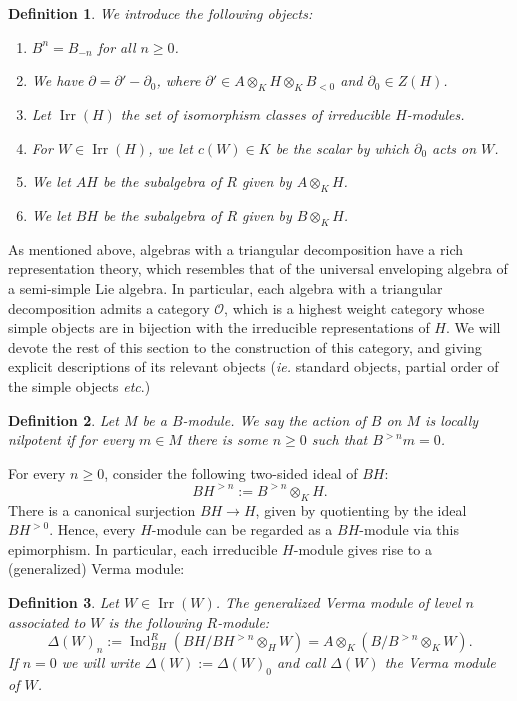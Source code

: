 \documentclass{amsart}
\newtheorem{defi}{ Definition}[subsection]
\newcommand{\OX}{\mathcal{O}}
\begin{document}
\begin{defi}\label{defi notions of triang decomp}
We introduce the following objects:
\begin{enumerate}[label=(\roman*)]
    \item $B^n=B_{-n}$ for all $n\geq 0$.
    \item We have $\partial=\partial'-\partial_0$, where $\partial'\in A\otimes_KH\otimes_K B_{<0}$ and $\partial_0\in Z(H)$.
    \item Let $\operatorname{Irr}(H)$ the set of isomorphism classes of irreducible $H$-modules. 
    \item For $W\in\operatorname{Irr}(H)$, we let $c(W)\in K$ be the scalar by which $\partial_0$ acts on $W$.
    \item We let $AH$ be  the subalgebra of $R$ given by  $A\otimes_KH$.
    \item We let $BH$ be  the subalgebra of $R$ given by  $B\otimes_KH$.
\end{enumerate}
\end{defi}
As mentioned above, algebras with a triangular decomposition have a rich representation theory, which resembles that of the universal enveloping algebra of a semi-simple Lie algebra. In particular, each algebra with a triangular decomposition admits a category $\OX$, which is a highest weight category whose simple objects are in bijection with the irreducible representations of $H$. We will devote the rest of this section to the construction of this category, and giving explicit descriptions of its relevant objects (\emph{ie.} standard objects,  partial order of the simple objects \emph{etc}.)
\begin{defi}
Let $M$ be a $B$-module. We say the action of $B$ on $M$ is locally nilpotent if for every $m\in M$ there is some $n\geq 0$ such that $B^{>n}m=0$.
\end{defi}
For every $n\geq 0$,  consider the following two-sided ideal of $BH$:
\begin{equation*}
    BH^{>n}:= B^{>n}\otimes_K H.
\end{equation*}
There is a canonical surjection $BH\rightarrow H$, given by quotienting by the ideal $BH^{>0}$. Hence, every $H$-module can be regarded as a $BH$-module via this epimorphism. In particular, each irreducible $H$-module gives rise to a (generalized) Verma module:
\begin{defi}\label{defi Verma modules}
Let $W\in\operatorname{Irr}(W)$. The generalized Verma module of level $n$ associated to $W$ is the following $R$-module:
\begin{equation*}
    \Delta(W)_n:=\operatorname{Ind}_{BH}^R(BH/BH^{>n}\otimes_H W)=A\otimes_K\left(B/B^{>n}\otimes_KW\right).
\end{equation*}
If $n=0$ we will write $\Delta(W):=\Delta(W)_0$ and call $\Delta(W)$ the Verma module of $W$. 
\end{defi}
\end{document}
